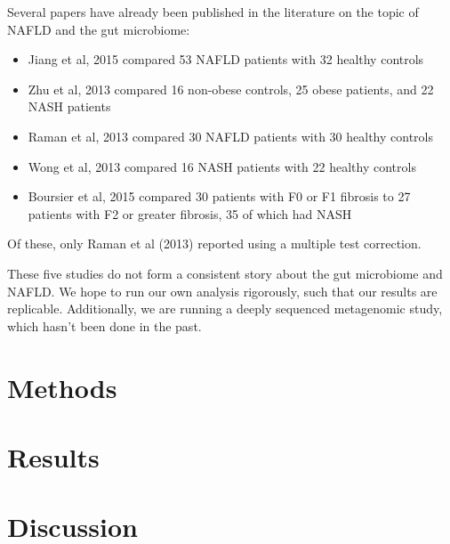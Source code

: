 Several papers have already been published in the literature on the topic of NAFLD and the gut microbiome:

\begin{itemize}
\item Jiang et al, 2015 compared 53 NAFLD patients with 32 healthy controls

\item Zhu et al, 2013 compared 16 non-obese controls, 25 obese patients, and 22 NASH patients

\item Raman et al, 2013 compared 30 NAFLD patients with 30 healthy controls

\item Wong et al, 2013 compared 16 NASH patients with 22 healthy controls

\item Boursier et al, 2015 compared 30 patients with F0 or F1 fibrosis to 27 patients with F2 or greater fibrosis, 35 of which had NASH
\end{itemize}

Of these, only Raman et al (2013) reported using a multiple test correction.

These five studies do not form a consistent story about the gut microbiome and NAFLD. We hope to run our own analysis rigorously, such that our results are replicable. Additionally, we are running a deeply sequenced metagenomic study, which hasn’t been done in the past.

\section{Methods}
\section{Results}
\section{Discussion}
